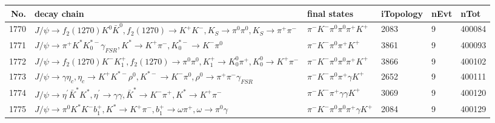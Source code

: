 \begin{table}[htbp] 
\begin{center}
\begin{small}
\begin{tabular}{rlllll}\hline\hline
 No. & decay chain & final states &  iTopology & nEvt & nTot \\\hline
1770&$J/\psi       \rightarrow f_{2}(1270)    K^{0}          \bar{K}^{0}   , f_{2}(1270)     \rightarrow K^{+}          K^{-}          , K_{S}           \rightarrow \pi^{0}        \pi^{0}        , K_{S}           \rightarrow \pi^{+}        \pi^{-}        $&$\pi^{-}        K^{-}          \pi^{0}        \pi^{0}        \pi^{+}        K^{+}          $& 2083&    9&400084\\
1771&$J/\psi       \rightarrow \pi^{+}        K^{*}          K_{0}^{*-}     \gamma_{FSR} , K^{*}           \rightarrow K^{+}          \pi^{-}        , K_{0}^{*-}      \rightarrow K^{-}          \pi^{0}        $&$\pi^{-}        K^{-}          \pi^{0}        \pi^{+}        K^{+}          $& 3861&    9&400093\\
1772&$J/\psi       \rightarrow f_{2}(1270)    K^{-}          K_1^{+}        , f_{2}(1270)     \rightarrow \pi^{0}        \pi^{0}        , K_1^{+}         \rightarrow K_0^{0}        \pi^{+}        , K_0^{0}         \rightarrow K^{+}          \pi^{-}        $&$\pi^{-}        K^{-}          \pi^{0}        \pi^{0}        \pi^{+}        K^{+}          $& 3866&    9&400102\\
1773&$J/\psi       \rightarrow \gamma       \eta_{c}    , \eta_{c}     \rightarrow K^{+}          K^{*-}         \rho^{0}      , K^{*-}          \rightarrow K^{-}          \pi^{0}        , \rho^{0}       \rightarrow \pi^{+}        \pi^{-}        \gamma_{FSR} $&$\pi^{-}        K^{-}          \pi^{0}        \pi^{+}        \gamma       K^{+}          $& 2652&    9&400111\\
1774&$J/\psi       \rightarrow \eta^{\prime} \bar{K}^{*}   K^{*}          , \eta^{\prime}  \rightarrow \gamma       \gamma       , \bar{K}^{*}    \rightarrow K^{-}          \pi^{+}        , K^{*}           \rightarrow K^{+}          \pi^{-}        $&$\pi^{-}        K^{-}          \pi^{+}        \gamma       \gamma       K^{+}          $& 3069&    9&400120\\
1775&$J/\psi       \rightarrow \pi^{0}        K^{*}          K^{-}          b_{1}^{+}      , K^{*}           \rightarrow K^{+}          \pi^{-}        , b_{1}^{+}       \rightarrow \omega         \pi^{+}        , \omega          \rightarrow \pi^{0}        \gamma       $&$\pi^{-}        K^{-}          \pi^{0}        \pi^{0}        \pi^{+}        \gamma       K^{+}          $& 2084&    9&400129\\

\end{tabular}
\end{small}
\end{center}
\end{table}
